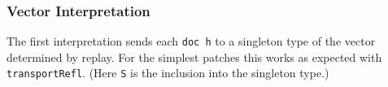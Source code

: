 \subsubsection{Vector Interpretation}

The first interpretation sends each \texttt{doc h} to a singleton type of the vector determined
by replay. For the simplest patches this works as expected with \texttt{transportRefl}.
(Here \texttt{S} is the inclusion into the singleton type.)

\begin{code}%
%
\>[2]\AgdaFunction{\AgdaUnderscore{}}\AgdaSpace{}%
\AgdaSymbol{:}\AgdaSpace{}%
\AgdaSpace{}%
\AgdaSpace{}%
\AgdaSymbol{(}\AgdaSpace{}%
\AgdaInductiveConstructor{[]}\AgdaSymbol{)}\AgdaSpace{}%
\AgdaSpace{}%
\AgdaSpace{}%
\AgdaSymbol{(}\AgdaSpace{}%
\AgdaSpace{}%
\AgdaInductiveConstructor{[]}\AgdaSymbol{)}\<%
\\
%
\>[2]\AgdaSymbol{\AgdaUnderscore{}}\AgdaSpace{}%
\AgdaSymbol{=}\AgdaSpace{}%
\AgdaSpace{}%
\AgdaSymbol{\AgdaUnderscore{}}\<%
\\
%
\\[\AgdaEmptyExtraSkip]%
%
\>[2]\AgdaFunction{\AgdaUnderscore{}}\AgdaSpace{}%
\AgdaSymbol{:}\AgdaSpace{}%
\AgdaSpace{}%
\AgdaSpace{}%
\AgdaSymbol{(}\AgdaSpace{}%
\AgdaSymbol{(}\AgdaSpace{}%
\AgdaSpace{}%
\AgdaInductiveConstructor{[]}\AgdaSymbol{))}\AgdaSpace{}%
\AgdaSpace{}%
\AgdaSpace{}%
\AgdaInductiveConstructor{[]}\<%
\\
%
\>[2]\AgdaSymbol{\AgdaUnderscore{}}\AgdaSpace{}%
\AgdaSymbol{=}\AgdaSpace{}%
\AgdaSpace{}%
\AgdaSymbol{\AgdaUnderscore{}}\<%
\\
%
\\[\AgdaEmptyExtraSkip]%
%
\>[2]\AgdaFunction{\AgdaUnderscore{}}\AgdaSpace{}%
\AgdaSymbol{:}\AgdaSpace{}%
\AgdaSpace{}%
\AgdaSpace{}%
\AgdaSymbol{(}\AgdaSpace{}%
\AgdaSpace{}%
\AgdaSymbol{(}\AgdaSpace{}%
\AgdaInductiveConstructor{[]}\AgdaSymbol{))}\AgdaSpace{}%
\AgdaSpace{}%
\AgdaSpace{}%
\AgdaInductiveConstructor{[]}\<%
\\

\end{code}
